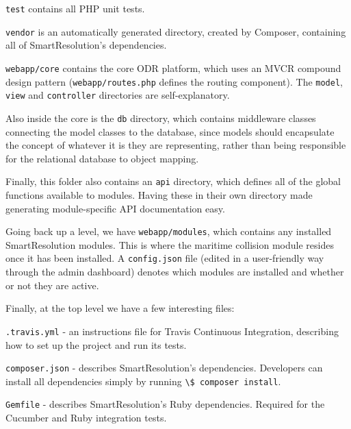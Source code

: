 \lstinline{test} contains all PHP unit tests.

\lstinline{vendor} is an automatically generated directory, created by Composer, containing all of SmartResolution's dependencies.

\lstinline{webapp/core} contains the core ODR platform, which uses an MVCR compound design pattern (\lstinline{webapp/routes.php} defines the routing component). The \lstinline{model}, \lstinline{view} and \lstinline{controller} directories are self-explanatory.

Also inside the core is the \lstinline{db} directory, which contains middleware classes connecting the model classes to the database, since models should encapsulate the concept of whatever it is they are representing, rather than being responsible for the relational database to object mapping.

Finally, this folder also contains an \lstinline{api} directory, which defines all of the global functions available to modules. Having these in their own directory made generating module-specific API documentation easy.

Going back up a level, we have \lstinline{webapp/modules}, which contains any installed SmartResolution modules. This is where the maritime collision module resides once it has been installed. A \lstinline{config.json} file (edited in a user-friendly way through the admin dashboard) denotes which modules are installed and whether or not they are active.

Finally, at the top level we have a few interesting files:

\lstinline{.travis.yml} - an instructions file for Travis Continuous Integration, describing how to set up the project and run its tests.

\lstinline{composer.json} - describes SmartResolution's dependencies. Developers can install all dependencies simply by running \lstinline{\$ composer install}.

\lstinline{Gemfile} - describes SmartResolution's Ruby dependencies. Required for the Cucumber and Ruby integration tests.
